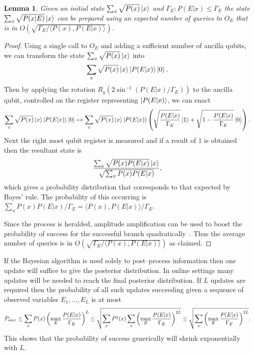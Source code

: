 \documentclass[aps,amsmath,onecolumn,amssymb,notitlepage]{revtex4-1}
\newtheorem{lemma}{Lemma}
\begin{document}
\begin{lemma}
Given an initial state $\sum_x \sqrt{P(x)} \left|x\right\rangle$ and $\Gamma_E : P(E|x) \le \Gamma_E$ the state $\sum_x \sqrt{P(x|E)} \left|x\right\rangle$ can be prepared using an expected number of queries to $O_E$ that is in $O(\sqrt{\Gamma_E/\langle P(x), P(E|x)\rangle})$.\label{lem:rejection}
\end{lemma}
\begin{proof}
Using a single call to $O_E$ and adding a sufficient number of ancilla qubits, we can transform the state $\sum_x \sqrt{P(x)} \left|x\right\rangle$ into
\begin{equation}
\sum_x \sqrt{P(x)} \left|x\right\rangle \left|P(E|x)\right\rangle\left|0\right\rangle.
\end{equation}
Then by applying the rotation $R_y(2 \sin^{-1}(P(E|x)/\Gamma_E))$ to the ancilla qubit, controlled on the register representing $\left|P(E|x)\right\rangle$, we can enact
\begin{equation}
\sum_x \sqrt{P(x)} \left|x\right\rangle \left|P(E|x)\right\rangle\left|0\right\rangle\mapsto \sum_x \sqrt{P(x)} \left|x\right\rangle \left|P(E|x)\right\rangle\left(\sqrt{\frac{P(E|x)}{\Gamma_E}}\left|1\right\rangle + \sqrt{1-\frac{P(E|x)}{\Gamma_E}}\left|0\right\rangle \right).\label{eq:rejection}
\end{equation}
Next the right most qubit register is measured and if a result of $1$ is obtained then the resultant state is
\begin{equation}
\frac{\sum_{x} \sqrt{P(x) P(E|x)}\left|x\right\rangle}{\sqrt{\sum_x P(x)P(E|x)}},
\end{equation}
which gives a probability distribution that corresponds to that expected by Bayes' rule.  The probability of this occurring is $\sum_x P(x) P(E|x) /\Gamma_E = \langle P(x), P(E|x) \rangle / \Gamma_E$.

Since the process is heralded, amplitude amplification can be used to boost the probability of success for the successful branch quadratically~\cite{BHM+02}.  Thus the average number of queries is in $O(\sqrt{\Gamma_E/\langle P(x), P(E|x)\rangle})$ as claimed.
\end{proof}

If the Bayesian algorithm is used solely to post--process information then one update will suffice to give the posterior distribution.  In online settings many updates will be needed to reach the final posterior distribution.  If $L$ updates are required then the probability of all such updates succeeding given a sequence of observed variables $E_1,\ldots,E_L$ is at most
\begin{equation}
P_{\rm succ} \le \sum_x P(x) \left(\max_E \frac{P(E|x)}{\Gamma_E}\right)^L\le \sqrt{\sum_x P^2(x)\sum_x \left(\max_E \frac{P(E|x)}{\Gamma_E}\right)^{2L}}\le\sqrt{\sum_x \left(\max_E \frac{P(E|x)}{\Gamma_E}\right)^{2L}}.
\end{equation}
This shows that the probability of success generically will shrink exponentially with $L$.
\end{document}
